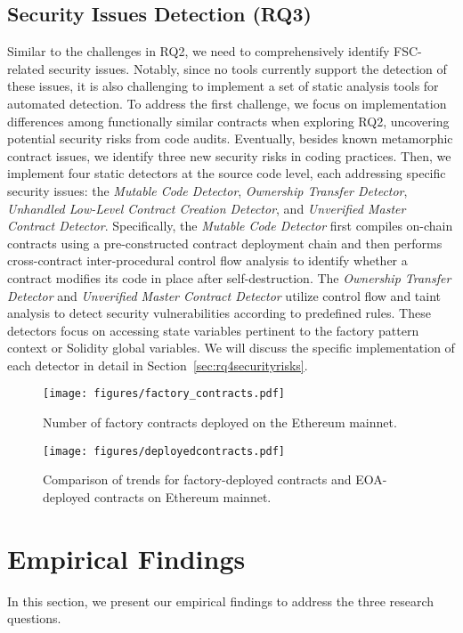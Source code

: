 \documentclass[acmsmall,screen]{acmart}
\begin{document}
	\subsection{Security Issues Detection (RQ3)}
	Similar to the challenges in RQ2, we need to comprehensively identify FSC-related security issues. Notably, since no tools currently support the detection of these issues, it is also challenging to implement a set of static analysis tools for automated detection. To address the first challenge, we focus on implementation differences among functionally similar contracts when exploring RQ2, uncovering potential security risks from code audits. Eventually, besides known metamorphic contract issues, we identify three new security risks in coding practices.
	Then, we implement four static detectors at the source code level, each addressing specific security issues: the \textit{Mutable Code Detector}, \textit{Ownership Transfer Detector}, \textit{Unhandled Low-Level Contract Creation Detector}, and \textit{Unverified Master Contract Detector}. Specifically, the \textit{Mutable Code Detector} first compiles on-chain contracts using a pre-constructed contract deployment chain and then performs cross-contract inter-procedural control flow analysis to identify whether a contract modifies its code in place after self-destruction. The \textit{Ownership Transfer Detector} and \textit{Unverified Master Contract Detector} utilize control flow and taint analysis to detect security vulnerabilities according to predefined rules. These detectors focus on accessing state variables pertinent to the factory pattern context or Solidity global variables. We will discuss the specific implementation of each detector in detail in Section~\ref{sec:rq4securityrisks}.


	\begin{figure}[h]
		\centering
		\texttt{[image: figures/factory\_contracts.pdf]}
		\caption{Number of factory contracts deployed on the Ethereum mainnet.}
		\label{fig:factorydeploy}
	\end{figure}

	\begin{figure}[h]
		\centering
		\texttt{[image: figures/deployedcontracts.pdf]}
		\caption{Comparison of trends for factory-deployed contracts and EOA-deployed contracts on Ethereum mainnet.}
		\label{fig:deployedcontracts}
	\end{figure}

	\section{Empirical Findings}\label{sec:findings}
	In this section, we present our empirical findings to address the three research questions.
\end{document}
